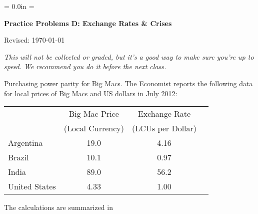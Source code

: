 \documentclass[12pt]{exam}
\def\HeadName{Practice Problems D}
\begin{document}
\parindent = 0.0in
\parskip = \bigskipamount
\thispagestyle{empty}%
\Head

\centerline{\large \bf \HeadName:  Exchange Rates \& Crises}
\centerline{Revised:  \today}

\medskip
{\it This will not be collected or graded,
but it's a good way to make sure you're up to speed.
We recommend you do it before the next class.}


\begin{questions}
\question Purchasing power parity for Big Macs.
The Economist reports the following data for
local prices of Big Macs and US dollars in July 2012:

\begin{center}
\begin{tabular}{lccc}
\toprule
        & Big Mac Price  &  Exchange Rate    \\
        &(Local Currency)&(LCUs per Dollar)   \\
\midrule
Argentina       &  19.0  &  4.16  \\
Brazil          &  10.1  &  0.97 \\
India           &  89.0  &  56.2   \\
United States   &  4.33  &  1.00   \\
\bottomrule
\end{tabular}
\end{center}
\medskip


\begin{solution}
The calculations are summarized in


\end{solution}
\end{questions}
\end{document}
